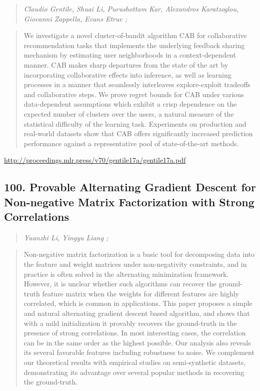 \documentclass{article}
\begin{document}
\begin{quote}
\footnotesize{\textit{Claudio Gentile, Shuai Li, Purushottam Kar, Alexandros Karatzoglou, Giovanni Zappella, Evans Etrue ;}}

\end{quote}

\begin{quote}
    We investigate a novel cluster-of-bandit algorithm CAB for collaborative recommendation tasks that implements the underlying feedback sharing mechanism by estimating user neighborhoods in a context-dependent manner. CAB makes sharp departures from the state of the art by incorporating collaborative effects into inference, as well as learning processes in a manner that seamlessly interleaves explore-exploit tradeoffs and collaborative steps. We prove regret bounds for CAB under various data-dependent assumptions which exhibit a crisp dependence on the expected number of clusters over the users, a natural measure of the statistical difficulty of the learning task. Experiments on production and real-world datasets show that CAB offers significantly increased prediction performance against a representative pool of state-of-the-art methods.  
\end{quote}

\href{http://proceedings.mlr.press/v70/gentile17a/gentile17a.pdf}{http://proceedings.mlr.press/v70/gentile17a/gentile17a.pdf}

\subsection{100. Provable Alternating Gradient Descent for Non-negative Matrix Factorization with Strong Correlations}

\begin{quote}
\footnotesize{\textit{Yuanzhi Li, Yingyu Liang ;}}

\end{quote}

\begin{quote}
    Non-negative matrix factorization is a basic tool for decomposing data into the feature and weight matrices under non-negativity constraints, and in practice is often solved in the alternating minimization framework. However, it is unclear whether such algorithms can recover the ground-truth feature matrix when the weights for different features are highly correlated, which is common in applications. This paper proposes a simple and natural alternating gradient descent based algorithm, and shows that with a mild initialization it provably recovers the ground-truth in the presence of strong correlations. In most interesting cases, the correlation can be in the same order as the highest possible. Our analysis also reveals its several favorable features including robustness to noise. We complement our theoretical results with empirical studies on semi-synthetic datasets, demonstrating its advantage over several popular methods in recovering the ground-truth.  
\end{quote}
\end{document}
